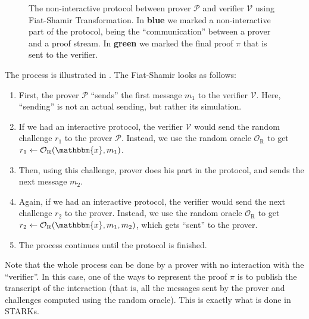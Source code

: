 \documentclass[../lecture-notes-148x210.tex]{subfiles}
\begin{document}
\begin{figure}[H]
{
    }

    \caption{The non-interactive protocol between prover $\mathcal{P}$ and verifier $\mathcal{V}$ using Fiat-Shamir Transformation. In \textcolor{blue!90!black}{\textbf{blue}} we marked a non-interactive part of the protocol, being the ``communication'' between a prover and a proof stream. In \textcolor{green!50!black}{\textbf{green}} we marked the final proof $\pi$ that is sent to the verifier.}
    \label{fig:fiat-shamir}
\end{figure}

The process is illustrated in . The Fiat-Shamir looks as follows:
\begin{enumerate}
    \item First, the prover $\mathcal{P}$ ``sends'' the first message $m_1$ to
    the verifier $\mathcal{V}$. Here, ``sending'' is not an actual sending, but
    rather its simulation.
    \item If we had an interactive protocol, the verifier $\mathcal{V}$ would
    send the random challenge $r_1$ to the prover $\mathcal{P}$. Instead, we use
    the random oracle $\mathcal{O}_{\text{R}}$ to get $r_1 \gets
    \mathcal{O}_{\text{R}}(\mathbbm{x},m_1)$.
    \item Then, using this challenge, prover does his part in the protocol, and
    sends the next message $m_2$. 
    \item Again, if we had an interactive protocol, the verifier would send the
    next challenge $r_2$ to the prover. Instead, we use the random oracle
    $\mathcal{O}_{\text{R}}$ to get $r_2 \gets
    \mathcal{O}_{\text{R}}(\mathbbm{x},m_1,m_2)$, which gets ``sent'' to the prover.
    \item The process continues until the protocol is finished.
\end{enumerate}

Note that the whole process can be done by a prover with no interaction with the
``verifier''. In this case, one of the ways to represent the proof $\pi$ is to
publish the transcript of the interaction (that is, all the messages sent by the
prover and challenges computed using the random oracle). This is exactly what is
done in STARKs.
\end{document}

